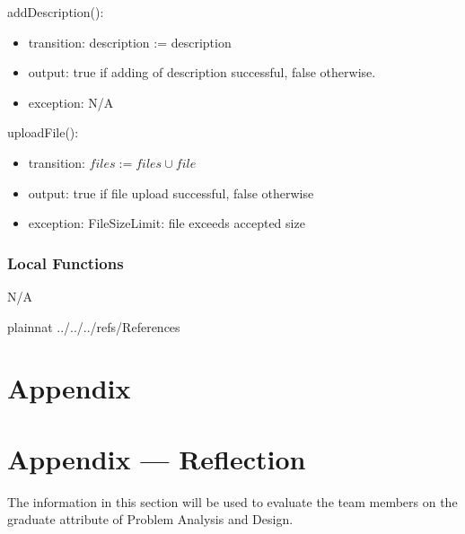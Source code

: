 \documentclass[12pt, titlepage]{article}
\begin{document}
\noindent addDescription():
\begin{itemize}
  \item transition: description := description
  \item output: true if adding of description successful, false otherwise.
  \item exception: N/A
\end{itemize}

\noindent uploadFile():
\begin{itemize}
  \item transition: $files := files \cup file$
  \item output: true if file upload successful, false otherwise
  \item exception: FileSizeLimit: file exceeds accepted size
\end{itemize}



\subsubsection{Local Functions}

N/A
\newpage

 {plainnat}
 {../../../refs/References}

\newpage

\section{Appendix} \label{Appendix}


\newpage{}

\section*{Appendix --- Reflection}


The information in this section will be used to evaluate the team members on the
graduate attribute of Problem Analysis and Design.
\end{document}
